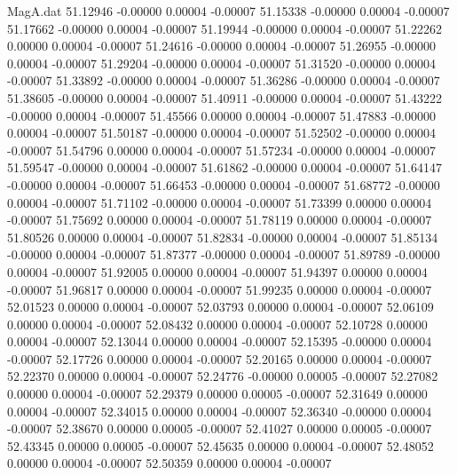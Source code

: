 \begin{filecontents}{MagA.dat}
  51.12946   -0.00000    0.00004   -0.00007
  51.15338   -0.00000    0.00004   -0.00007
  51.17662   -0.00000    0.00004   -0.00007
  51.19944   -0.00000    0.00004   -0.00007
  51.22262    0.00000    0.00004   -0.00007
  51.24616   -0.00000    0.00004   -0.00007
  51.26955   -0.00000    0.00004   -0.00007
  51.29204   -0.00000    0.00004   -0.00007
  51.31520   -0.00000    0.00004   -0.00007
  51.33892   -0.00000    0.00004   -0.00007
  51.36286   -0.00000    0.00004   -0.00007
  51.38605   -0.00000    0.00004   -0.00007
  51.40911   -0.00000    0.00004   -0.00007
  51.43222   -0.00000    0.00004   -0.00007
  51.45566    0.00000    0.00004   -0.00007
  51.47883   -0.00000    0.00004   -0.00007
  51.50187   -0.00000    0.00004   -0.00007
  51.52502   -0.00000    0.00004   -0.00007
  51.54796    0.00000    0.00004   -0.00007
  51.57234   -0.00000    0.00004   -0.00007
  51.59547   -0.00000    0.00004   -0.00007
  51.61862   -0.00000    0.00004   -0.00007
  51.64147   -0.00000    0.00004   -0.00007
  51.66453   -0.00000    0.00004   -0.00007
  51.68772   -0.00000    0.00004   -0.00007
  51.71102   -0.00000    0.00004   -0.00007
  51.73399    0.00000    0.00004   -0.00007
  51.75692    0.00000    0.00004   -0.00007
  51.78119    0.00000    0.00004   -0.00007
  51.80526    0.00000    0.00004   -0.00007
  51.82834   -0.00000    0.00004   -0.00007
  51.85134   -0.00000    0.00004   -0.00007
  51.87377   -0.00000    0.00004   -0.00007
  51.89789   -0.00000    0.00004   -0.00007
  51.92005    0.00000    0.00004   -0.00007
  51.94397    0.00000    0.00004   -0.00007
  51.96817    0.00000    0.00004   -0.00007
  51.99235    0.00000    0.00004   -0.00007
  52.01523    0.00000    0.00004   -0.00007
  52.03793    0.00000    0.00004   -0.00007
  52.06109    0.00000    0.00004   -0.00007
  52.08432    0.00000    0.00004   -0.00007
  52.10728    0.00000    0.00004   -0.00007
  52.13044    0.00000    0.00004   -0.00007
  52.15395   -0.00000    0.00004   -0.00007
  52.17726    0.00000    0.00004   -0.00007
  52.20165    0.00000    0.00004   -0.00007
  52.22370    0.00000    0.00004   -0.00007
  52.24776   -0.00000    0.00005   -0.00007
  52.27082    0.00000    0.00004   -0.00007
  52.29379    0.00000    0.00005   -0.00007
  52.31649    0.00000    0.00004   -0.00007
  52.34015    0.00000    0.00004   -0.00007
  52.36340   -0.00000    0.00004   -0.00007
  52.38670    0.00000    0.00005   -0.00007
  52.41027    0.00000    0.00005   -0.00007
  52.43345    0.00000    0.00005   -0.00007
  52.45635    0.00000    0.00004   -0.00007
  52.48052    0.00000    0.00004   -0.00007
  52.50359    0.00000    0.00004   -0.00007

\end{filecontents}
